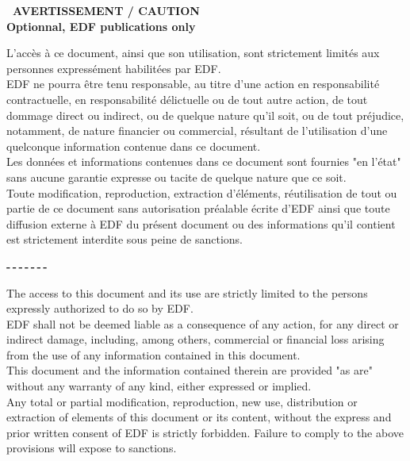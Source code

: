 %
\vspace*{0.1cm}
\begin{center}
\textbf{\large\ AVERTISSEMENT / CAUTION \\
Optionnal, EDF publications only}
\end{center}
%
\bigskip
\bigskip
\bigskip
%
L'acc\`es \`a ce document, ainsi que son utilisation, sont strictement limit\'es aux personnes express\'ement habilit\'ees par EDF. \\

EDF ne pourra \^etre tenu responsable, au titre d'une action en responsabilit\'e contractuelle, en responsabilit\'e d\'elictuelle ou de tout autre action, de tout dommage direct ou indirect, ou de quelque nature qu'il soit, ou de tout pr\'ejudice, notamment, de nature financier ou commercial, r\'esultant de l'utilisation d'une quelconque information contenue dans ce document.\\

Les donn\'ees et informations contenues dans ce document sont fournies "en l'\'etat" sans aucune garantie expresse ou tacite de quelque nature que ce soit. \\

Toute modification, reproduction, extraction d'\'el\'ements, r\'eutilisation de tout ou partie de ce document sans autorisation pr\'ealable \'ecrite d'EDF ainsi que toute diffusion externe \`a EDF du pr\'esent document ou des informations qu'il contient est strictement interdite sous peine de sanctions.
\bigskip
\bigskip
%
\begin{center}
\textbf{-\,-\,-\,-\,-\,-\,-}
\end{center}
\bigskip
\bigskip
%
The access to this document and its use are strictly limited to the persons expressly authorized to do so by EDF.\\

EDF shall not be deemed liable as a consequence of any action, for any direct or indirect damage, including, among others, commercial or financial loss arising from the use of any information contained in this document.\\

This document and the information contained therein are provided "as are" without any warranty of any kind, either expressed or implied.\\

Any total or partial modification, reproduction, new use, distribution or extraction of elements of this document or its content, without the express and prior written consent of EDF is strictly forbidden. Failure to comply to the above provisions will expose to sanctions.\\\\

%
%
